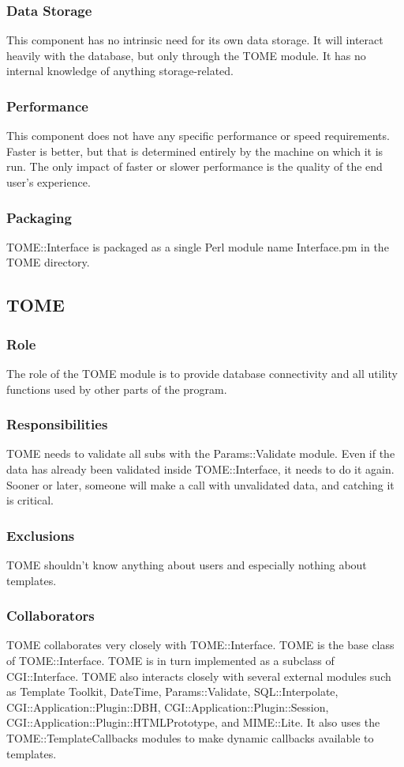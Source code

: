\documentclass[12pt,titlepage]{article}
\begin{document}
\subsubsection{Data Storage}
This component has no intrinsic need for its own data storage.  It will interact heavily with the database, but only through the TOME module.  It has no internal knowledge of anything storage-related.
\subsubsection{Performance}
This component does not have any specific performance or speed requirements.  Faster is better, but that is determined entirely by the machine on which it is run.  The only impact of faster or slower performance is the quality of the end user's experience.
\subsubsection{Packaging}
TOME::Interface is packaged as a single Perl module name Interface.pm in the TOME directory.


\subsection{TOME}
\subsubsection{Role}
The role of the TOME module is to provide database connectivity and all utility functions used by other parts of the program.
\subsubsection{Responsibilities}
TOME needs to validate all subs with the Params::Validate module. Even if the data has already been validated inside TOME::Interface, it needs to do it again. Sooner or later, someone will make a call with unvalidated data, and catching it is critical.
\subsubsection{Exclusions}
TOME shouldn't know anything about users and especially nothing about templates.
\subsubsection{Collaborators}
TOME collaborates very closely with TOME::Interface.  TOME is the base class of TOME::Interface.  TOME is in turn implemented as a subclass of CGI::Interface.  TOME also interacts closely with several external modules such as Template Toolkit, DateTime, Params::Validate, SQL::Interpolate, CGI::Application::Plugin::DBH, CGI::Application::Plugin::Session, CGI::Application::Plugin::HTMLPrototype, and MIME::Lite.  It also uses the TOME::TemplateCallbacks modules to make dynamic callbacks available to templates.
\end{document}
